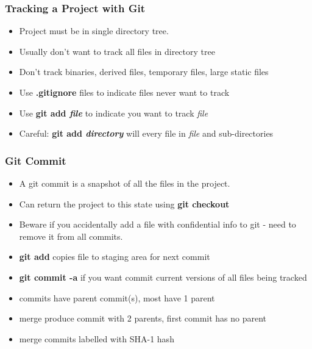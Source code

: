 \begin{frame}
\frametitle{Tracking a Project with Git}

\begin{itemize}
\item  Project must be in single directory tree.

\item Usually don't want to track all files in directory tree

\item Don't track binaries, derived files, temporary files, large static files

\item Use {\bf .gitignore} files  to indicate files never want to track

\item Use {\bf git add {\it file}} to indicate you want to track {\it file}

\item Careful: {\bf git add {\it directory}} will every file in {\it file} and sub-directories
\end{itemize}

\end{frame}

\begin{frame}
\frametitle{Git Commit}

\begin{itemize}
\item A git commit is a snapshot of all the files in the project.

\item Can return the project to this state using {\bf git checkout}

\item Beware if you  accidentally  add a file with confidential info 
to git - need to remove it from all commits.

\item {\bf git add} copies file to staging area for next commit

\item {\bf git commit -a} if you want commit current versions of all files being tracked

\item commits have parent commit(s), most have 1 parent

\item merge produce commit with 2 parents, first commit has no parent

\item merge commits labelled with SHA-1 hash
\end{itemize}
\end{frame}


